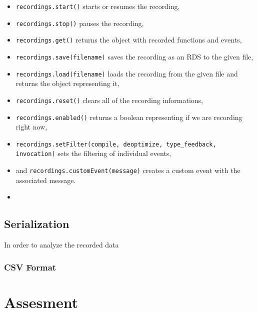 \begin{itemize}
	\item \texttt{recordings.start()} starts or resumes the recording,
	\item \texttt{recordings.stop()} pauses the recording,
	\item \texttt{recordings.get()} returns the object with recorded functions and events,

	\item \texttt{recordings.save(filename)} saves the recording as an RDS to the given file,
	\item \texttt{recordings.load(filename)} loads the recording from the given file and returns the object representing it,

	\item \texttt{recordings.reset()} clears all of the recording informations,
	\item \texttt{recordings.enabled()} returns a boolean representing if we are recording right now,

	\item \texttt{recordings.setFilter(compile, deoptimize, type\_feedback, invocation)} sets the filtering of individual events,

	\item and \texttt{recordings.customEvent(message)} creates a custom event with the associated message.
	\item {}
\end{itemize}

\subsection{Serialization}

In order to analyze the recorded data

\subsubsection*{CSV Format}

\section{Assesment}

